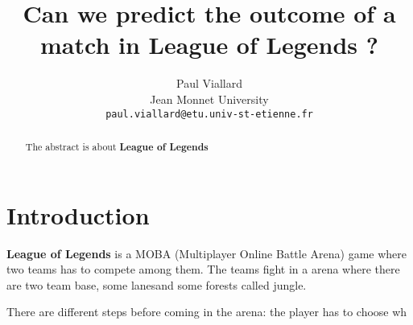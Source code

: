 \documentclass{article}
\title{Can we predict the outcome of a match in League of Legends ?}
\author{
  Paul Viallard\\
  Jean Monnet University\\
  \texttt{paul.viallard@etu.univ-st-etienne.fr} \\
}
\def\lol{\textbf{League of Legends }}
\begin{document}
\maketitle

\begin{abstract}
  The abstract is about \lol 
\end{abstract}

\section{Introduction}

\lol is a MOBA (Multiplayer Online Battle Arena) game where two teams has to compete among them. The teams fight in a arena where there are two team base, some lanesand some forests called jungle. 


There are different steps before coming in the arena: the player has to choose wh 
\end{document}
